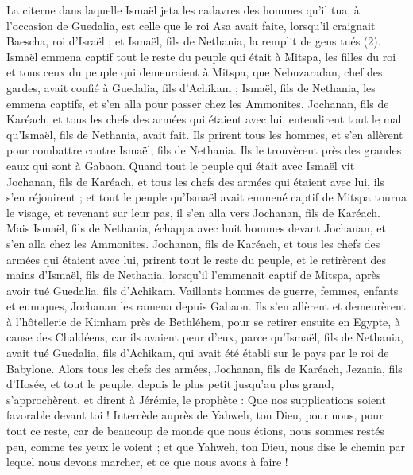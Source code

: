 \begin{multicols}{2}
La citerne dans laquelle Ismaël jeta les cadavres des hommes qu'il tua, à l'occasion de Guedalia, est celle que le roi Asa avait faite, lorsqu'il craignait Baescha, roi d'Israël ; et Ismaël, fils de Nethania, la remplit de gens tués\FTNT{} (2).
Ismaël emmena captif tout le reste du peuple qui était à Mitspa, les filles du roi et tous ceux du peuple qui demeuraient à Mitspa, que Nebuzaradan, chef des gardes, avait confié à Guedalia, fils d'Achikam ; Ismaël, fils de Nethania, les emmena captifs, et s'en alla pour passer chez les Ammonites.
Jochanan, fils de Karéach, et tous les chefs des armées qui étaient avec lui, entendirent tout le mal qu'Ismaël, fils de Nethania, avait fait.
Ils prirent tous les hommes, et s'en allèrent pour combattre contre Ismaël, fils de Nethania. Ils le trouvèrent près des grandes eaux qui sont à Gabaon.
Quand tout le peuple qui était avec Ismaël vit Jochanan, fils de Karéach, et tous les chefs des armées qui étaient avec lui, ils s'en réjouirent ;
et tout le peuple qu'Ismaël avait emmené captif de Mitspa tourna le visage, et revenant sur leur pas, il s'en alla vers Jochanan, fils de Karéach.
Mais Ismaël, fils de Nethania, échappa avec huit hommes devant Jochanan, et s'en alla chez les Ammonites.
Jochanan, fils de Karéach, et tous les chefs des armées qui étaient avec lui, prirent tout le reste du peuple, et le retirèrent des mains d'Ismaël, fils de Nethania, lorsqu'il l’emmenait captif de Mitspa, après avoir tué Guedalia, fils d'Achikam. Vaillants hommes de guerre, femmes, enfants et eunuques, Jochanan les ramena depuis Gabaon.
Ils s'en allèrent et demeurèrent à l’hôtellerie de Kimham près de Bethléhem, pour se retirer ensuite en Egypte,
à cause des Chaldéens, car ils avaient peur d'eux, parce qu'Ismaël, fils de Nethania, avait tué Guedalia, fils d'Achikam, qui avait été établi sur le pays par le roi de Babylone.
\VerseOne{}Alors tous les chefs des armées, Jochanan, fils de Karéach, Jezania, fils d’Hosée, et tout le peuple, depuis le plus petit jusqu’au plus grand, s'approchèrent,
et dirent à Jérémie, le prophète : Que nos supplications soient favorable devant toi ! Intercède auprès de Yahweh, ton Dieu, pour nous, pour tout ce reste, car de beaucoup de monde que nous étions, nous sommes restés peu, comme tes yeux le voient ;
et que Yahweh, ton Dieu, nous dise le chemin par lequel nous devons marcher, et ce que nous avons à faire !

\end{multicols}

